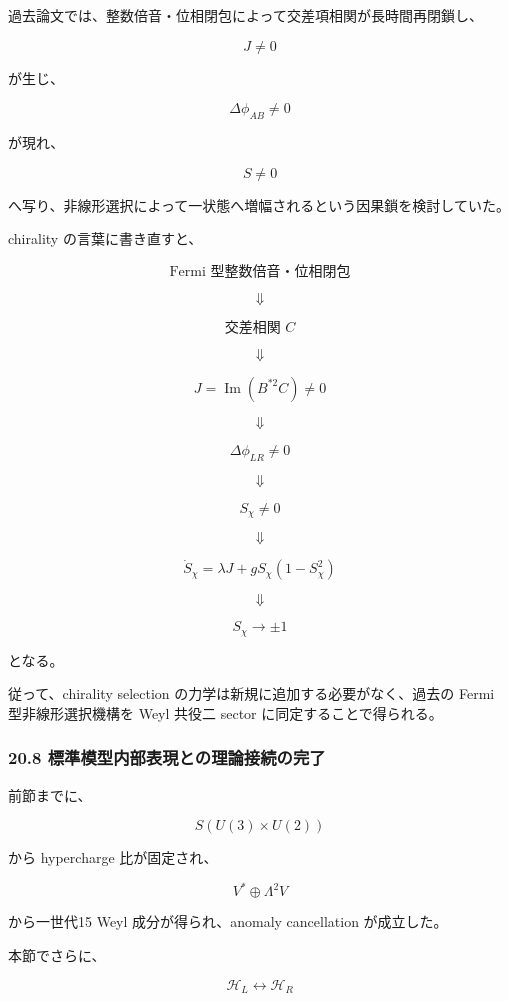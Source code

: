 \documentclass[
  a4paper,
]{ltjsarticle}
\begin{document}
過去論文では、整数倍音・位相閉包によって交差項相関が長時間再閉鎖し、

\[
J\neq0
\]

が生じ、

\[
\Delta\phi_{AB}\neq0
\]

が現れ、

\[
S\neq0
\]

へ写り、非線形選択によって一状態へ増幅されるという因果鎖を検討していた。

chirality の言葉に書き直すと、

\[
\boxed{
\text{Fermi 型整数倍音・位相閉包}
}
\]

\[
\Downarrow
\]

\[
\boxed{
\text{交差相関 }C
}
\]

\[
\Downarrow
\]

\[
\boxed{
J
=
\operatorname{Im}(B^{*2}C)
\neq0
}
\]

\[
\Downarrow
\]

\[
\boxed{
\Delta\phi_{LR}\neq0
}
\]

\[
\Downarrow
\]

\[
\boxed{
S_\chi\neq0
}
\]

\[
\Downarrow
\]

\[
\boxed{
\dot S_\chi
=
\lambda J
+
gS_\chi(1-S_\chi^2)
}
\]

\[
\Downarrow
\]

\[
\boxed{
S_\chi\to\pm1
}
\tag{171}
\]

となる。

従って、chirality selection の力学は新規に追加する必要がなく、過去の
Fermi 型非線形選択機構を Weyl 共役二 sector に同定することで得られる。

\subsubsection{20.8
標準模型内部表現との理論接続の完了}\label{ux6a19ux6e96ux6a21ux578bux5185ux90e8ux8868ux73feux3068ux306eux7406ux8ad6ux63a5ux7d9aux306eux5b8cux4e86}

前節までに、

\[
S(U(3)\times U(2))
\]

から hypercharge 比が固定され、

\[
V^*\oplus\Lambda^2V
\]

から一世代15 Weyl 成分が得られ、anomaly cancellation が成立した。

本節でさらに、

\[
\mathcal H_L
\leftrightarrow
\mathcal H_R
\]
\end{document}
